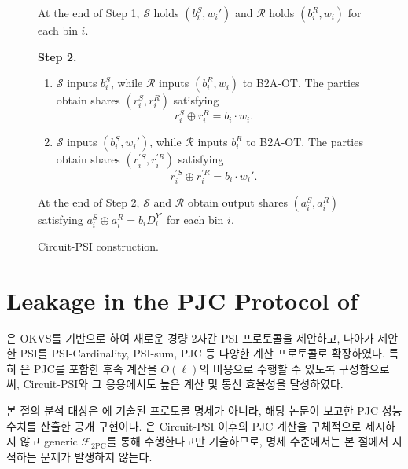 \documentclass[sigconf,anonymous,review]{acmart}
\begin{document}
\begin{figure}[t]
{\begin{minipage}{0.95\linewidth}
\begin{enumerate}
\end{enumerate}

At the end of Step 1, $\mathcal{S}$ holds $(b_i^S,w_i')$ and
$\mathcal{R}$ holds $(b_i^R,w_i)$ for each bin $i$.

\medskip

\textbf{Step 2.}

\begin{enumerate}
    \item
    $\mathcal{S}$ inputs $b_i^S$, while $\mathcal{R}$ inputs $(b_i^R,w_i)$
    to B2A-OT. The parties obtain shares $(r_i^S,r_i^R)$
    satisfying
    \[
        r_i^S\oplus r_i^R=b_i\cdot w_i.
    \]

    \item
    $\mathcal{S}$ inputs $(b_i^S,w_i')$, while $\mathcal{R}$ inputs $b_i^R$
    to B2A-OT. The parties obtain shares
    $(r_i^{\prime S},r_i^{\prime R})$ satisfying
    \[
        r_i^{\prime S}\oplus r_i^{\prime R}
        =b_i\cdot w_i'.
    \]

\end{enumerate}
At the end of Step 2, $\mathcal{S}$ and $\mathcal{R}$ obtain output shares
$(a_i^S,a_i^R)$ satisfying
$a_i^S\oplus a_i^R=b_iD_i^{Y'}$ for each bin $i$.


\end{minipage}%
}
\caption{Circuit-PSI construction.}
\label{fig:cpsi-construction}
\end{figure}


\section{Leakage in the PJC Protocol of~\cite{LTS+26}}\label{sec:cryptanalysis}
\cite{LTS+26}은 OKVS를 기반으로 하여 새로운 경량 2자간 PSI 프로토콜을 제안하고, 나아가 제안한 PSI를 PSI-Cardinality, PSI-sum, PJC 등 다양한 계산 프로토콜로 확장하였다. 특히 \cite{LTS+26}은 PJC를 포함한 후속 계산을 $O(\ell)$의 비용으로 수행할 수 있도록 구성함으로써, Circuit-PSI와 그 응용에서도 높은 계산 및 통신
효율성을 달성하였다.

본 절의 분석 대상은 \cite{LTS+26}에 기술된 프로토콜 명세가 아니라, 해당 논문이 보고한 PJC 성능 수치를 산출한 공개 구현이다. \cite{LTS+26}은 Circuit-PSI 이후의 PJC 계산을 구체적으로 제시하지 않고 generic $\mathcal{F}_{\mathrm{2PC}}$를 통해 수행한다고만 기술하므로, 명세 수준에서는 본 절에서 지적하는 문제가 발생하지 않는다.
\end{document}
